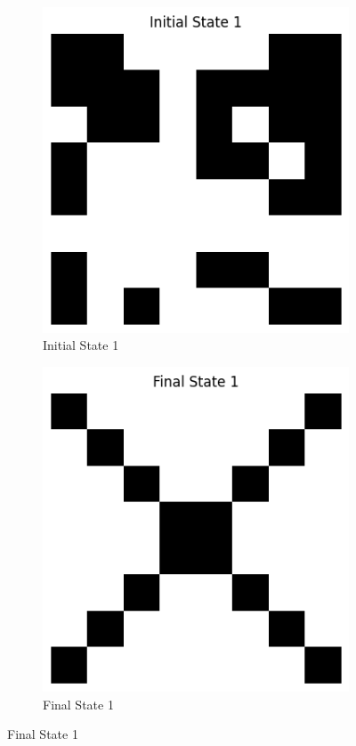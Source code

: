 \documentclass{article}
\begin{document}
\begin{figure}[H]
\centering
\begin{subfigure}{0.2\textwidth}
\includegraphics[width=\textwidth]{Initial State 1.png}
\caption{Initial State 1}
\end{subfigure}
\begin{subfigure}{0.2\textwidth}
\includegraphics[width=\textwidth]{Final State 1.png}
\caption{Final State 1}
\end{subfigure}


\end{figure}
\end{document}
